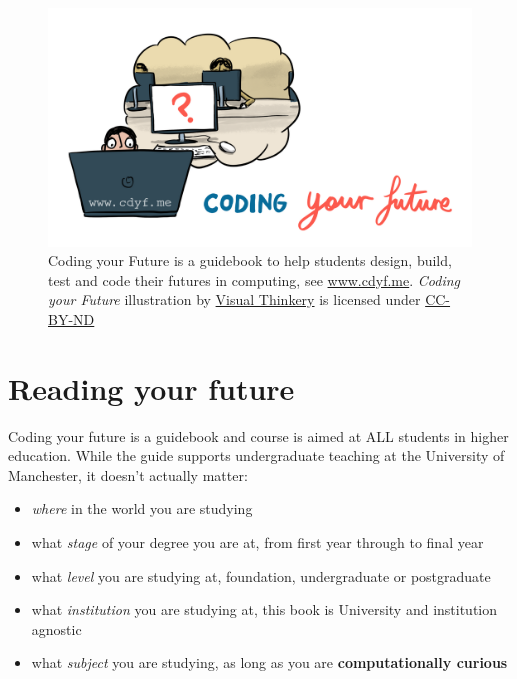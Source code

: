 \documentclass[
  12pt,
]{book}
\providecommand{\tightlist}{%
  \setlength{\itemsep}{0pt}\setlength{\parskip}{0pt}}
\begin{document}
\begin{figure}

{\centering \includegraphics[width=0.98\linewidth]{images/Coding your future} 

}

\caption{Coding your Future is a guidebook to help students design, build, test and code their futures in computing, see \href{https://www.cdyf.me}{www.cdyf.me}. \emph{Coding your Future} illustration by \href{https://visualthinkery.com/}{Visual Thinkery} is licensed under \href{https://creativecommons.org/licenses/by-nd/4.0/}{CC-BY-ND}}\label{fig:cdyf-fig}
\end{figure}



\hypertarget{reading}{%
\section{Reading your future}\label{reading}}

Coding your future is a guidebook and course is aimed at ALL students in higher education. While the guide supports undergraduate teaching at the University of Manchester, it doesn't actually matter:

\begin{itemize}
\tightlist
\item
  \emph{where} in the world you are studying
\item
  what \emph{stage} of your degree you are at, from first year through to final year
\item
  what \emph{level} you are studying at, foundation, undergraduate or postgraduate
\item
  what \emph{institution} you are studying at, this book is University and institution agnostic
\item
  what \emph{subject} you are studying, as long as you are \textbf{computationally curious}
\end{itemize}
\end{document}
